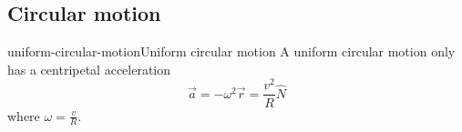 \documentclass[preview]{standalone}
\begin{document}

\subsection{Circular motion}

\begin{snippetproposition}{uniform-circular-motion}{Uniform circular motion}
    A uniform circular motion only has a centripetal acceleration
    \[
        \vec{a} = -\omega^2\vec{r} = \frac{v^2}{R} \hat{N}
    \]
    where \(\omega = \frac{v}{R}\).
\end{snippetproposition}
\end{document}
